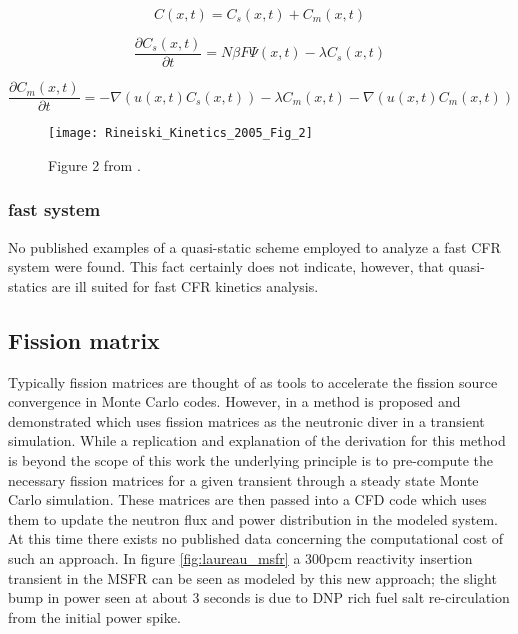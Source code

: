 \documentclass[review]{elsarticle}
\begin{document}
\begin{equation}
    \label{eq:spk_uni}
    C(x,t) = C_{s}(x,t) + C_{m}(x,t)
\end{equation}

\begin{equation}
    \label{eq:spk_static}
    \frac{\partial C_{s}(x,t)}{\partial t} = N \beta F \Psi(x,t) -
        \lambda C_{s}(x,t)
\end{equation}
 
\begin{equation}
    \label{eq:spk_move}
    \frac{\partial C_{m}(x,t)}{\partial t} = - \nabla (u(x,t) C_{s}(x,t)) -
        \lambda C_{m}(x,t) - \nabla(u(x,t) C_{m}(x,t))
\end{equation}

\begin{figure}[h]
   \centering
   \texttt{[image: Rineiski\_Kinetics\_2005\_Fig\_2]}
   \caption{Figure 2 from \cite{rineiski_kinetics_2005}.} 
   \label{fig:rinesiki_mre_ps}
\end{figure}

\subsubsection{fast system} \label{sssec:qs_fast}
No published examples of a quasi-static scheme employed to analyze a fast
CFR system were found. This fact certainly does not indicate, however, that
quasi-statics are ill suited for fast CFR kinetics analysis.

\subsection{Fission matrix}
Typically fission matrices are thought of as tools to accelerate the fission
source convergence in Monte Carlo codes. However, in 
\cite{laureau_coupled_2015} a method is proposed and demonstrated which uses
fission matrices as the neutronic diver in a transient simulation. While a
replication and explanation of the derivation for this method is beyond the
scope of this work the underlying principle is to pre-compute the necessary
fission matrices for a given transient through a steady state Monte Carlo
simulation. These matrices are then passed into a CFD code which uses them
to update the neutron flux and power distribution in the modeled system. At
this time there exists no published data concerning the computational cost
of such an approach. In figure \ref{fig:laureau_msfr} a 300pcm reactivity
insertion transient in the MSFR can be seen as modeled by this new approach; the
slight bump in power seen at about 3 seconds is due to DNP rich fuel salt
re-circulation from the initial power spike.
\end{document}
